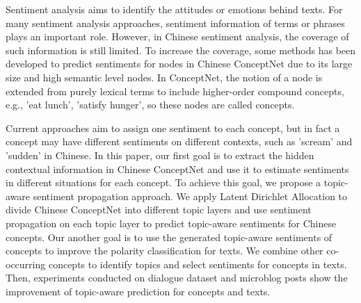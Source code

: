 Sentiment analysis aims to identify the attitudes or emotions behind texts. For many sentiment analysis approaches, sentiment information of terms or phrases plays an important role. However, in Chinese sentiment analysis, the coverage of such information is still limited. To increase the coverage, some methods has been developed to predict sentiments for nodes in Chinese ConceptNet due to its large size and high semantic level nodes. In ConceptNet, the notion of a node is extended from purely lexical terms to include higher-order compound concepts, e.g., 'eat lunch', 'satisfy hunger', so these nodes are called concepts. 

Current approaches aim to assign one sentiment to each concept, but in fact a concept may have different sentiments on different contexts, such as 'scream' and 'sudden' in Chinese. In this paper, our first goal is to extract the hidden contextual information in Chinese ConceptNet and use it to estimate sentiments in different situations for each concept. To achieve this goal, we propose a topic-aware sentiment propagation approach. We apply Latent Dirichlet Allocation to divide Chinese ConceptNet into different topic layers and use sentiment propagation on each topic layer to predict topic-aware sentiments for Chinese concepts. Our another goal is to use the generated topic-aware sentiments of concepts to improve the polarity classification for texts. We combine other co-occurring concepts to identify topics and select sentiments for concepts in texts. Then, experiments conducted on dialogue dataset and microblog posts show the improvement of topic-aware prediction for concepts and texts. 